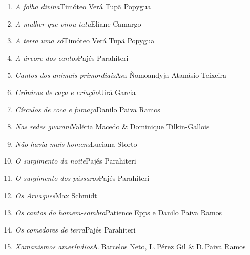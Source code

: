 \medskip
{}

\begin{enumerate}
\setlength\parskip{4.2pt}
\setlength\itemsep{-1.4mm}
\item \textit{A folha divina}\quad Timóteo Verá Tupã Popygua
\item \textit{A mulher que virou tatu}\quad Eliane Camargo
\item \textit{A terra uma só}\quad Timóteo Verá Tupã Popygua
\item \textit{A árvore dos cantos}\quad Pajés Parahiteri
\item \textit{Cantos dos animais primordiais}\quad Ava Ñomoandyja Atanásio Teixeira
\item \textit{Crônicas de caça e criação}\quad Uirá Garcia
\item \textit{Círculos de coca e fumaça}\quad Danilo Paiva Ramos
\item \textit{Nas redes guarani}\quad Valéria Macedo \& Dominique Tilkin-Gallois
\item \textit{Não havia mais homens}\quad Luciana Storto
\item \textit{O surgimento da noite}\quad Pajés Parahiteri
\item \textit{O surgimento dos pássaros}\quad Pajés Parahiteri
\item \textit{Os Aruaques}\quad Max Schmidt
\item \textit{Os cantos do homem-sombra}\quad Patience Epps e Danilo Paiva Ramos
\item \textit{Os comedores de terra}\quad Pajés Parahiteri
\item \textit{Xamanismos ameríndios}\quad A.\,Barcelos Neto, L.\,Pérez Gil \& D.\,Paiva Ramos
\end{enumerate}

\medskip
{}

